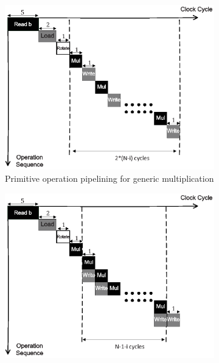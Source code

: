\documentclass[runningheads]{llncs}
\begin{document}


\begin{figure}[!tb]
\centering
\begin{subfigure}[t]{0.47\textwidth}\centering
\includegraphics[width=\textwidth]{./fig/pipeline_dsnmul.eps}
\caption{Primitive operation pipelining for generic multiplication}
\label{fig:pipeline_gmul}
\end{subfigure}
\hspace{1em}
\begin{subfigure}[t]{0.47\textwidth}\centering
\includegraphics[width=\textwidth]{./fig/pipeline_dsnmul2.eps}

\end{subfigure}
\end{figure}
\end{document}
